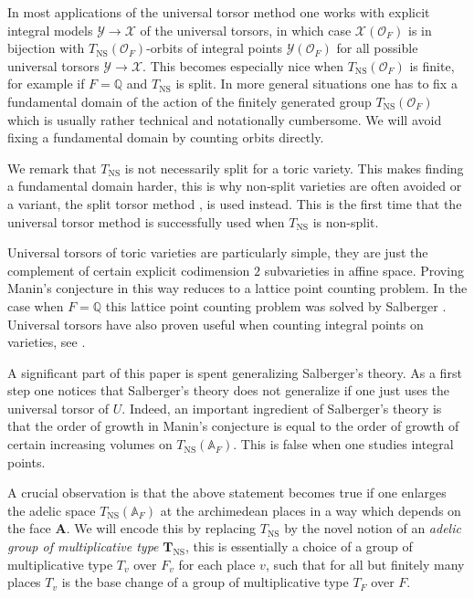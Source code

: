 \documentclass[a4paper,11pt,reqno]{amsart}
\newcommand{\Q}{\mathbb{Q}}
\newcommand{\A}{\mathbb{A}}
\DeclareMathOperator{\NS}{NS}
\theoremstyle{definition}
\begin{document}
In most applications of the universal torsor method one works with explicit integral models $\mathcal{Y} \to \mathcal{X}$ of the universal torsors, in which case $\mathcal{X}(\mathcal{O}_F)$ is in bijection with $T_{\NS}(\mathcal{O}_F)$-orbits of integral points $\mathcal{Y}(\mathcal{O}_F)$ for all possible universal torsors $\mathcal{Y} \to \mathcal{X}$. This becomes especially nice when $T_{\NS}(\mathcal{O}_F)$ is finite, for example if $F = \Q$ and $T_{\NS}$ is split. In more general situations one has to fix a fundamental domain of the action of the finitely generated group $T_{\NS}(\mathcal{O}_F)$ which is usually rather technical and notationally cumbersome. We will avoid fixing a fundamental domain by counting orbits directly.

We remark that $T_{\NS}$ is not necessarily split for a toric variety. This makes finding a fundamental domain harder, this is why non-split varieties are often avoided or a variant, the split torsor method \cite{Derenthal2020Split}, is used instead. This is the first time that the universal torsor method is successfully used when $T_{\NS}$ is non-split.

Universal torsors of toric varieties are particularly simple, they are just the complement of certain explicit codimension $2$ subvarieties in affine space. Proving Manin's conjecture in this way reduces to a lattice point counting problem. In the case when $F = \Q$ this lattice point counting problem was solved by Salberger \cite[\S 11]{Salberger1998Tamagawa}. Universal torsors have also proven useful when counting integral points on varieties, see \cite{Wilsch2022Integral,Derenthal2022Integral,Wilsch2023Integral}.

A significant part of this paper is spent generalizing Salberger's theory. As a first step one notices that Salberger's theory does not generalize if one just uses the universal torsor of $U$. Indeed, an important ingredient of Salberger's theory is that the order of growth in Manin's conjecture is equal to the order of growth of certain increasing volumes on $T_{\NS}(\A_F)$. This is false when one studies integral points.

A crucial observation is that the above statement becomes true if one enlarges the adelic space $T_{\NS}(\A_F)$ at the archimedean places in a way which depends on the face $\mathbf{A}$. We will encode this by replacing $T_{\NS}$ by the novel notion of an \emph{adelic group of multiplicative type} $\mathbf{T}_{\NS}$, this is essentially a choice of a group of multiplicative type $T_v$ over $F_v$ for each place $v$, such that for all but finitely many places $T_v$ is the base change of a group of multiplicative type $T_F$ over $F$.
\end{document}
